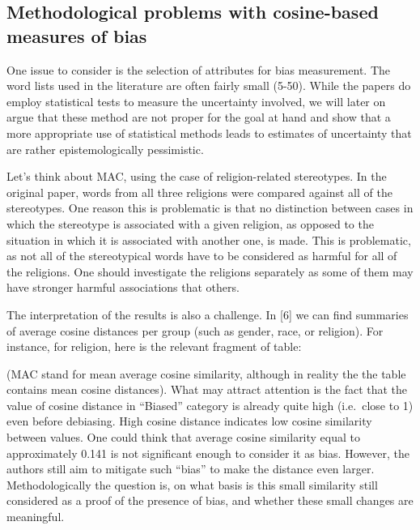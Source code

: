 \documentclass[
  10pt,
  dvipsnames,enabledeprecatedfontcommands]{scrartcl}
\begin{document}
\hypertarget{methodological-problems-with-cosine-based-measures-of-bias}{%
\subsection{Methodological problems with cosine-based measures of
bias}\label{methodological-problems-with-cosine-based-measures-of-bias}}

One issue to consider is the selection of attributes for bias
measurement. The word lists used in the literature are often fairly
small (5-50). While the papers do employ statistical
tests to measure the uncertainty involved, we will later on argue that
these method are not proper for the goal at hand and show that a more
appropriate use of statistical methods leads to estimates of uncertainty
that are rather epistemologically pessimistic.

Let's think about MAC, using the case of religion-related
stereotypes. In the
original paper, words from all three religions were compared against all
of the stereotypes. One reason this is problematic is that no
distinction between cases in which the stereotype is associated with a
given religion, as opposed to the situation in which it is associated
with another one, is made. This is problematic, as not all of the
stereotypical words have to be considered as harmful for all of the
religions. One should investigate the religions separately as some of
them may have stronger harmful associations that others.

The interpretation of the results is also a challenge. In {[}6{]} we can
find summaries of average cosine distances per group (such as gender,
race, or religion). For instance, for religion, here is the relevant
fragment of table:


\noindent (MAC stand for mean average cosine similarity, although in
reality the the table contains mean cosine distances). What may attract
attention is the fact that the value of cosine distance in ``Biased''
category is already quite high (i.e.~close to 1) even before debiasing.
High cosine distance indicates low cosine similarity between values. One
could think that average cosine similarity equal to approximately 0.141
is not significant enough to consider it as bias. However, the authors
still aim to mitigate such ``bias'' to make the distance even larger.
Methodologically the question is, on what basis is this small similarity
still considered as a proof of the presence of bias, and whether these
small changes are meaningful.
\end{document}
